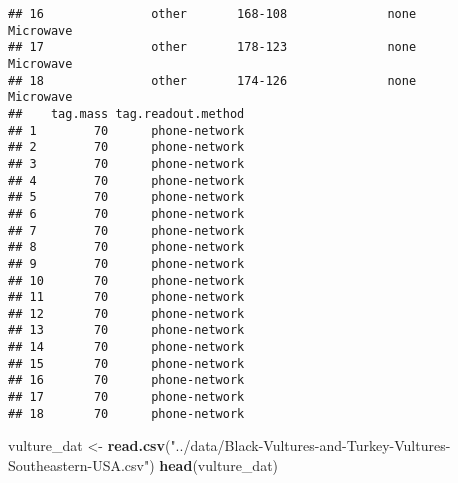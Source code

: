 \documentclass[
]{article}
\newenvironment{Shaded}{\begin{snugshade}}{\end{snugshade}}
\newcommand{\FunctionTok}[1]{\textcolor[rgb]{0.13,0.29,0.53}{\textbf{#1}}}
\newcommand{\NormalTok}[1]{#1}
\newcommand{\OtherTok}[1]{\textcolor[rgb]{0.56,0.35,0.01}{#1}}
\newcommand{\StringTok}[1]{\textcolor[rgb]{0.31,0.60,0.02}{#1}}
\begin{document}
\begin{verbatim}
## 16               other       168-108              none             Microwave
## 17               other       178-123              none             Microwave
## 18               other       174-126              none             Microwave
##    tag.mass tag.readout.method
## 1        70      phone-network
## 2        70      phone-network
## 3        70      phone-network
## 4        70      phone-network
## 5        70      phone-network
## 6        70      phone-network
## 7        70      phone-network
## 8        70      phone-network
## 9        70      phone-network
## 10       70      phone-network
## 11       70      phone-network
## 12       70      phone-network
## 13       70      phone-network
## 14       70      phone-network
## 15       70      phone-network
## 16       70      phone-network
## 17       70      phone-network
## 18       70      phone-network
\end{verbatim}

\begin{Shaded}
\begin{Highlighting}[]
\NormalTok{vulture\_dat }\OtherTok{\textless{}{-}} \FunctionTok{read.csv}\NormalTok{(}\StringTok{"../data/Black{-}Vultures{-}and{-}Turkey{-}Vultures{-}Southeastern{-}USA.csv"}\NormalTok{)}
\FunctionTok{head}\NormalTok{(vulture\_dat)}
\end{Highlighting}
\end{Shaded}
\end{document}
